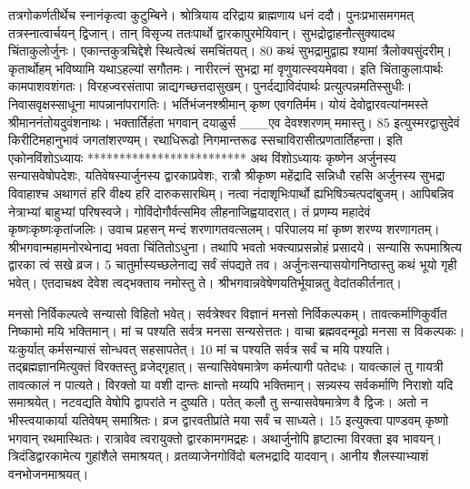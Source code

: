तत्रगोकर्णतीर्थेच स्नानंकृत्वा कुटुम्बिने।
 श्रोत्रियाय दरिद्राय ब्राह्मणाय धनं ददौ।
 पुनःप्रभासमगमत् तत्रस्नात्वार्चयन् द्विजान्।
 तान् विसृज्य ततःपार्थो द्वारकापुरमेयिवान्।
 सुभद्रोद्वाहनौत्सुक्यादथ चिंताकुलोर्जुनः।
 एकान्तकुत्रचिद्देशे स्थित्वेत्थं समचिंतयत्।
 80 कथं सुभद्रामुद्वाह्य श्यामां त्रैलोक्यसुंदरीम्।
 कृतार्थोहम् भविष्यामि यथाऽहल्यां सगौतमः।
 नारीरत्नं सुभद्रा मां वृणुयात्स्वयमेववा।
 इति चिंताकुलाःपार्थः कामपाशवशंगतः।
 विरहज्वरसंतापा न्नाद्यगच्छत्तदासुखम्।
 पुनर्दद्याविदंपार्थः प्रत्युत्पन्नमतिस्सुधीः।
 निवासवृक्षस्साधूना मापन्नानांपरागतिः।
 भर्तिभंजनश्श्रीमान् कृष्ण एवगतिर्मम।
 योयं देवोद्वारवत्यांनमस्ते श्रीमाननंतोयदुवंशनाथः।
 भक्तार्तिहंता भगवान् दयाळुर्स
___एव देवश्शरणम् ममास्तु।
85 इत्युस्मरद्वासुदेवं किरीटिमहानुभावं
जगतांशरण्यम्।
 रथाधिरूढो निगमान्तरूढ
स्सचाविरासीत्प्रणतार्तिहन्ता।
 इति एकोनविंशोऽध्यायः
*************************
अथ विंशोऽध्यायः कृष्णेन अर्जुनस्य सन्यासवेषोपदेशः, यतिवेषस्यार्जुनस्य द्वारकाप्रवेशः, रात्रौ श्रीकृष्ण महेंद्रादि सन्निधौ रहसि अर्जुनस्य सुभद्रा विवाहाश्च अथागतं हरि वीक्ष्य हरि दारुकसारथिम्।
 नत्वा नंदाशृभिःपार्थो ह्यभिषिञ्चत्पदांबुजम्।
 आपिबन्निव नेत्राभ्यां बाहुभ्यां परिषस्वजे।
 गोविंदोगौर्वत्समिव लीहनाजिह्वयादरात्।
 तं प्रणम्य महादेवं कृष्णःकृष्णःकृतांजलिः।
 उवाच प्रहसन् मन्दं शरणागतवत्सलम्।
 परिपालय मां कृष्ण शरण्य शरणागतम्।
 श्रीभगवान्महामनोरथेनाद्य भवता चिंतितोऽधुना।
 तथापि भवतो भक्त्याप्रसन्नोहं प्रसादये।
 सन्यासि रूपमाश्रित्य द्वारका त्वं सखे व्रज।
 5 चातुर्मास्यच्छलेनाद्य सर्वं संपद्यते तव।
 अर्जुनःसन्यासयोगनिष्ठास्तु कथं भूयो गृही भवेत्।
 एतदाचक्ष्व देवेश त्वद्भक्ताय नमोस्तु ते।
 श्रीभगवान्नवेषेणयतिर्भूयान्नतु वेदांतकीर्तनात्।
 
मनसो निर्विकल्पत्वे सन्यासो विहितो भवेत्।
 सर्वत्रेश्वर विज्ञानं मनसो निर्विकल्पकम्।
 तावत्कर्माणिकुर्वीत निष्कामो मयि भक्तिमान्।
 मां च पश्यति सर्वत्र मनसा सन्यसेत्ततः।
 वाचा ब्रह्मवदन्मूढो मनसा स विकल्पकः।
 यःकुर्यात् कर्मसन्यासं सोन्धवत् सहसापतेत्।
 10 मां च पश्यति सर्वत्र सर्वं च मयि पश्यति।
 तद्ब्रह्मज्ञानमित्युक्तं विरक्तस्तु व्रजेद्गृहात्।
 सन्यासिवेषमात्रेण कर्मत्यागी पतेदधः।
 यावत्कालं तु गायत्री तावत्कालं न पात्यते।
 विरक्तो या वशी दान्तः क्षान्तो मय्यपि भक्तिमान्।
 सन्न्यस्य सर्वकर्माणि निराशो यदि समाश्रयेत्।
 नटवद्यति वेषोपि द्वापरांते न दुष्यति।
 पतेत् कलौ तु सन्यासवेषमात्रेण वै द्विजः।
 अतो न भीस्त्वयाकार्या यतिवेषम् समाश्रितः।
 व्रज द्वारवतीप्रांते मया सर्वं च साध्यते।
 15 इत्युक्त्वा पाण्डवम् कृष्णो भगवान् रथमास्थितः।
 रात्रावेव त्वरायुक्तो द्वारकामगमद्रहः।
 अथार्जुनोपि हृष्टात्मा विरक्ता इव भावयन्।
 त्रिदंडिद्वारकामेत्य गुहांशैले समाश्रयत्।
 व्रतव्याजेनगोविंदो बलभद्रादि यादवान्।
 आनीय शैलस्याभ्याशं वनभोजनमाश्रयत्।
 
